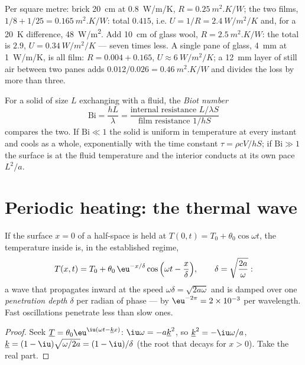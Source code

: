 \begin{example}\label{ex:b2:heat-conduction:wall}
Per square metre: brick \qty{20}{cm} at \qty{0.8}{W/m/K}, $R =
\qty{0.25}{m^2.K/W}$; the two films, $1/8 + 1/25 = \qty{0.165}{m^2.K/W}$:
total $0.415$, i.e. $U = 1/R = \qty{2.4}{W/m^2/K}$ and, for a \qty{20}{K}
difference, \qty{48}{W/m^2}. Add \qty{10}{cm} of glass wool, $R =
\qty{2.5}{m^2.K/W}$: the total is $2.9$, $U = \qty{0.34}{W/m^2/K}$ ---
seven times less. A single pane of glass, \qty{4}{mm} at \qty{1}{W/m/K},
is all film: $R = 0.004 + 0.165$, $U \approx \qty{6}{W/m^2/K}$; a
\qty{12}{mm} layer of still air between two panes adds $0.012/0.026 =
\qty{0.46}{m^2.K/W}$ and divides the loss by more than three.
\end{example}

\begin{definition}\label{def:b2:heat-conduction:biot}
For a solid of size $L$ exchanging with a fluid, the \emph{Biot
number}
\[
\mathrm{Bi} = \frac{hL}{\lambda} = \frac{\text{internal resistance } L/\lambda S}{\text{film resistance } 1/hS}
\]
compares the two. If $\mathrm{Bi} \ll 1$ the solid is uniform in
temperature at every instant and cools as a whole, exponentially with
the time constant $\tau = \rho c V/hS$; if $\mathrm{Bi} \gg 1$ the
surface is at the fluid temperature and the interior conducts at its
own pace $L^2/a$.
\end{definition}

\section{Periodic heating: the thermal wave}

\begin{proposition}\label{prop:b2:heat-conduction:wave}
If the surface $x = 0$ of a half-space is held at $T(0,t) = T_0 +
\theta_0\cos\omega t$, the temperature inside is, in the established
regime,
\[
T(x,t) = T_0 + \theta_0\,\eu^{-x/\delta}\cos\Big(\omega t - \frac{x}{\delta}\Big),
\qquad \delta = \sqrt{\frac{2a}{\omega}} :
\]
a wave that propagates inward at the speed $\omega\delta =
\sqrt{2a\omega}$ and is damped over one \emph{penetration depth} $\delta$
per radian of phase --- by $\eu^{-2\pi} = 2 \times 10^{-3}$ per
wavelength. Fast oscillations penetrate less than slow ones.
\end{proposition}

\begin{proof}
Seek $\underline T = \theta_0\eu^{\iu(\omega t - \underline k x)}$:
$\iu\omega = -a\underline k^2$, so $\underline k^2 = -\iu\omega/a$,
$\underline k = (1 - \iu)\sqrt{\omega/2a} = (1 - \iu)/\delta$ (the root
that decays for $x > 0$). Take the real part.
\end{proof}

